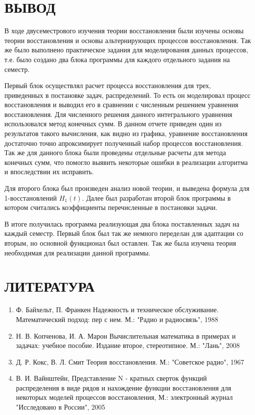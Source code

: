 \chapter*{ВЫВОД}
В ходе двусеместрового изучения теории  восстановления были изучены основы теории восстановления и основы альтернирующих процессов восстановления. Так же было выполнено практическое задания для моделирования данных  процессов, т.е. было создано два блока программы для каждого отдельного задания на семестр.

Первый блок осуществлял расчет процесса восстановления для трех, приведенных в постановке задач, распределений. То есть он моделировал процесс восстановления и выводил его в сравнении с численным решением уравнения восстановления. Для численного решения данного интегрального уравнения использовался метод конечных сумм. В данном отчете приведен один из результатов такого вычисления, как видно из графика, уравнение восстановления достаточно точно апроксимирует полученный набор процессов восстановления. Так же для данного блока были проведены отдельные расчеты для метода конечных сумм, что помогло выявить некоторые ошибки в реализации алгоритма и впоследствии их исправить.

Для второго блока был произведен анализ новой теории, и выведена формула для 1-восстановлений $H_1(t)$. Далее был разработан второй блок программы в котором считались коэффициенты перечисленные в постановки задачи.

В итоге получилась программа реализующая два блока поставленных задач на каждый семестр. Первый блок был так же немного переделан для адаптации со вторым, но основной функционал был оставлен. Так же была изучена теория необходимая для реализации данной программы.

\chapter*{ЛИТЕРАТУРА}
\begin{enumerate}
\item  Ф. Байхельт, П. Франкен Надежность и техническое обслуживание. Математический подход: пер с нем. М.: "Радио и радиосвязь", 1988
\item Н. В. Копченова, И. А. Марон Вычислительная математика в примерах и задачах: учебное пособие. Издание второе, стереотипное. М.: "Лань", 2008
\item Д. Р. Кокс, В. Л. Смит Теория восстановления. М.: "Советское радио", 1967
\item В. И. Вайнштейн, Представление N - кратных сверток функций распределения в виде рядов и нахождение функции восстановления для некоторых
моделей процессов восстановления, М.: электронный журнал "Исследовано в России", 2005
\end{enumerate}